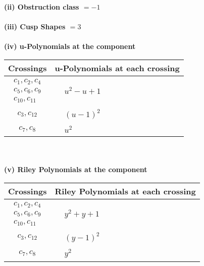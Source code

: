 \documentclass[1p]{elsarticle_modified}
\theoremstyle{definition}
\begin{document}
\flushleft \textbf{(ii) Obstruction class $= -1$}\\~\\
\flushleft \textbf{(iii) Cusp Shapes $= 3$}\\~\\
\newpage\renewcommand{\arraystretch}{1}
\flushleft \textbf{(iv) u-Polynomials at the component}\newline \\
\begin{tabular}{m{50pt}|m{274pt}}
Crossings & \hspace{64pt}u-Polynomials at each crossing \\
\hline $$\begin{aligned}c_{1},c_{2},c_{4}\\c_{5},c_{6},c_{9}\\c_{10},c_{11}\end{aligned}$$&$\begin{aligned}
&u^2- u+1
\end{aligned}$\\
\hline $$\begin{aligned}c_{3},c_{12}\end{aligned}$$&$\begin{aligned}
&(u-1)^2
\end{aligned}$\\
\hline $$\begin{aligned}c_{7},c_{8}\end{aligned}$$&$\begin{aligned}
&u^2
\end{aligned}$\\
\hline
\end{tabular}\\~\\
\newpage\renewcommand{\arraystretch}{1}
\flushleft \textbf{(v) Riley Polynomials at the component}\newline \\
\begin{tabular}{m{50pt}|m{274pt}}
Crossings & \hspace{64pt}Riley Polynomials at each crossing \\
\hline $$\begin{aligned}c_{1},c_{2},c_{4}\\c_{5},c_{6},c_{9}\\c_{10},c_{11}\end{aligned}$$&$\begin{aligned}
&y^2+y+1
\end{aligned}$\\
\hline $$\begin{aligned}c_{3},c_{12}\end{aligned}$$&$\begin{aligned}
&(y-1)^2
\end{aligned}$\\
\hline $$\begin{aligned}c_{7},c_{8}\end{aligned}$$&$\begin{aligned}
&y^2
\end{aligned}$\\
\hline
\end{tabular}\\~\\
\end{document}
